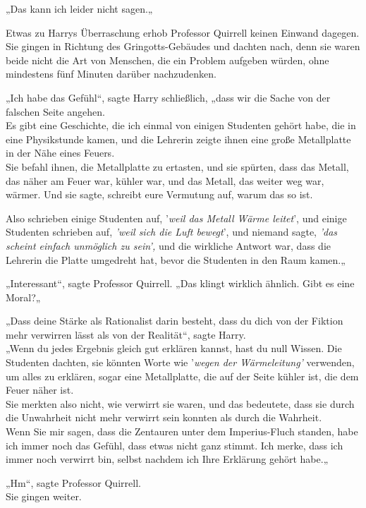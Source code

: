 {„Das kann ich leider nicht sagen.„

Etwas zu Harrys Überraschung erhob Professor Quirrell keinen Einwand dagegen.\\ Sie gingen in Richtung des Gringotts-Gebäudes und dachten nach, denn sie waren beide nicht die Art von Menschen, die ein Problem aufgeben würden, ohne mindestens fünf Minuten darüber nachzudenken.

„Ich habe das Gefühl“, sagte Harry schließlich, „dass wir die Sache von der falschen Seite angehen.\\ Es gibt eine Geschichte, die ich einmal von einigen Studenten gehört habe, die in eine Physikstunde kamen, und die Lehrerin zeigte ihnen eine große Metallplatte in der Nähe eines Feuers.\\ Sie befahl ihnen, die Metallplatte zu ertasten, und sie spürten, dass das Metall, das näher am Feuer war, kühler war, und das Metall, das weiter weg war, wärmer. Und sie sagte, schreibt eure Vermutung auf, warum das so ist.

Also schrieben einige Studenten auf, '\emph{weil das Metall Wärme leitet}', und einige Studenten schrieben auf, \emph{'weil sich die Luft bewegt}', und niemand sagte, \emph{'das scheint einfach unmöglich zu sein',} und die wirkliche Antwort war, dass die Lehrerin die Platte umgedreht hat, bevor die Studenten in den Raum kamen.„

„Interessant“, sagte Professor Quirrell. „Das klingt wirklich ähnlich. Gibt es eine Moral?„

„Dass deine Stärke als Rationalist darin besteht, dass du dich von der Fiktion mehr verwirren lässt als von der Realität“, sagte Harry.\\ „Wenn du jedes Ergebnis gleich gut erklären kannst, hast du null Wissen. Die Studenten dachten, sie könnten Worte wie '\emph{wegen der Wärmeleitung'} verwenden, um alles zu erklären, sogar eine Metallplatte, die auf der Seite kühler ist, die dem Feuer näher ist.\\ Sie merkten also nicht, wie verwirrt sie waren, und das bedeutete, dass sie durch die Unwahrheit nicht mehr verwirrt sein konnten als durch die Wahrheit.\\ Wenn Sie mir sagen, dass die Zentauren unter dem Imperius-Fluch standen, habe ich immer noch das Gefühl, dass etwas nicht ganz stimmt. Ich merke, dass ich immer noch verwirrt bin, selbst nachdem ich Ihre Erklärung gehört habe.„

„Hm“, sagte Professor Quirrell.\\ Sie gingen weiter.

}
